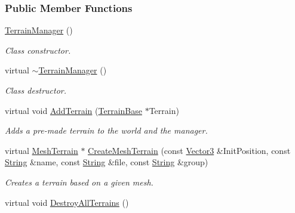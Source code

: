 \subsubsection*{Public Member Functions}
\begin{DoxyCompactItemize}
\item 
\hypertarget{classMezzanine_1_1TerrainManager_acc5ec25398260bc73cbb3c6d206f76d6}{
\hyperlink{classMezzanine_1_1TerrainManager_acc5ec25398260bc73cbb3c6d206f76d6}{TerrainManager} ()}
\label{classMezzanine_1_1TerrainManager_acc5ec25398260bc73cbb3c6d206f76d6}

\begin{DoxyCompactList}\small\item\em Class constructor. \item\end{DoxyCompactList}\item 
\hypertarget{classMezzanine_1_1TerrainManager_ae3896cc32b3a674511c851716e251d1a}{
virtual \hyperlink{classMezzanine_1_1TerrainManager_ae3896cc32b3a674511c851716e251d1a}{$\sim$TerrainManager} ()}
\label{classMezzanine_1_1TerrainManager_ae3896cc32b3a674511c851716e251d1a}

\begin{DoxyCompactList}\small\item\em Class destructor. \item\end{DoxyCompactList}\item 
virtual void \hyperlink{classMezzanine_1_1TerrainManager_ace206114313eb7dcd96706a10195dea6}{AddTerrain} (\hyperlink{classMezzanine_1_1TerrainBase}{TerrainBase} $\ast$Terrain)
\begin{DoxyCompactList}\small\item\em Adds a pre-\/made terrain to the world and the manager. \item\end{DoxyCompactList}\item 
virtual \hyperlink{classMezzanine_1_1MeshTerrain}{MeshTerrain} $\ast$ \hyperlink{classMezzanine_1_1TerrainManager_acb65dd655f4e42ac530442ffb35f12e0}{CreateMeshTerrain} (const \hyperlink{classMezzanine_1_1Vector3}{Vector3} \&InitPosition, const \hyperlink{namespaceMezzanine_acf9fcc130e6ebf08e3d8491aebcf1c86}{String} \&name, const \hyperlink{namespaceMezzanine_acf9fcc130e6ebf08e3d8491aebcf1c86}{String} \&file, const \hyperlink{namespaceMezzanine_acf9fcc130e6ebf08e3d8491aebcf1c86}{String} \&group)
\begin{DoxyCompactList}\small\item\em Creates a terrain based on a given mesh. \item\end{DoxyCompactList}\item 
\hypertarget{classMezzanine_1_1TerrainManager_a8e97f7a8f58e782ff43f18c53901fb50}{
virtual void \hyperlink{classMezzanine_1_1TerrainManager_a8e97f7a8f58e782ff43f18c53901fb50}{DestroyAllTerrains} ()}
\label{classMezzanine_1_1TerrainManager_a8e97f7a8f58e782ff43f18c53901fb50}


\end{DoxyCompactItemize}
